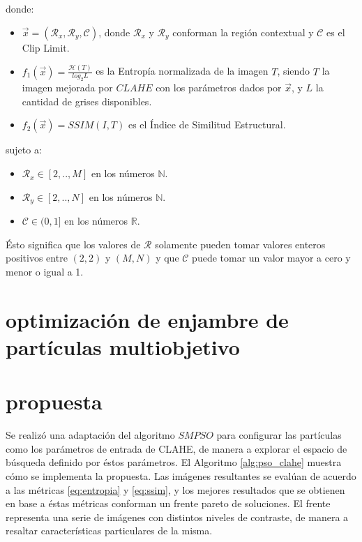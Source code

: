\documentclass[spanish,twocolumn]{article}
\begin{document}
donde:
\begin{itemize}
\item $\overrightarrow{x}=(\mathcal{R}_x, \mathcal{R}_y, \mathcal{C})$, donde $\mathcal{R}_x$ y $\mathcal{R}_y$ conforman la región contextual y $\mathscr{C}$ es el Clip Limit.
\item $f_{1}(\overrightarrow{x})=\frac{\mathscr{H}(T)}{log_{2}L}$ es la Entropía normalizada de la imagen $T$, siendo $T$ la imagen mejorada por $CLAHE$ con los parámetros dados por $\overrightarrow{x}$, y $L$ la cantidad de grises disponibles.
\item $f_{2}(\overrightarrow{x})=SSIM(I,T)$ es el Índice de Similitud Estructural.
\end{itemize}

sujeto a:

\begin{itemize}
\item $\mathcal{R}_x \in [2,..,M]$ en los números $\mathbb{N}$.
\item $\mathcal{R}_y \in [2,..,N]$ en los números $\mathbb{N}$.
\item $\mathscr{C} \in (0,1]$ en los números $\mathbb{R}$.
\end{itemize}

Ésto significa que los valores de $\mathcal{R}$ solamente pueden tomar valores enteros positivos entre $(2,2)$ y $(M,N)$ y que $\mathscr{C}$ puede tomar un valor mayor a cero y menor o igual a 1.

\section{optimización de enjambre de partículas multiobjetivo}
\label{sec:mspso}



\section{propuesta}
\label{sec:propuesta}

Se realizó una adaptación del algoritmo $SMPSO$ para configurar las partículas como los parámetros de entrada de CLAHE, de manera a explorar el espacio de búsqueda definido por éstos parámetros. El Algoritmo \eqref{alg:pso_clahe} muestra cómo se implementa la propuesta. Las imágenes resultantes se evalúan de acuerdo a las métricas \eqref{eq:entropia} y \eqref{eq:ssim}, y los mejores resultados que se obtienen en base a éstas métricas conforman un frente pareto de soluciones. El frente representa una serie de imágenes con distintos niveles de contraste, de manera a resaltar características particulares de la misma.
\end{document}

